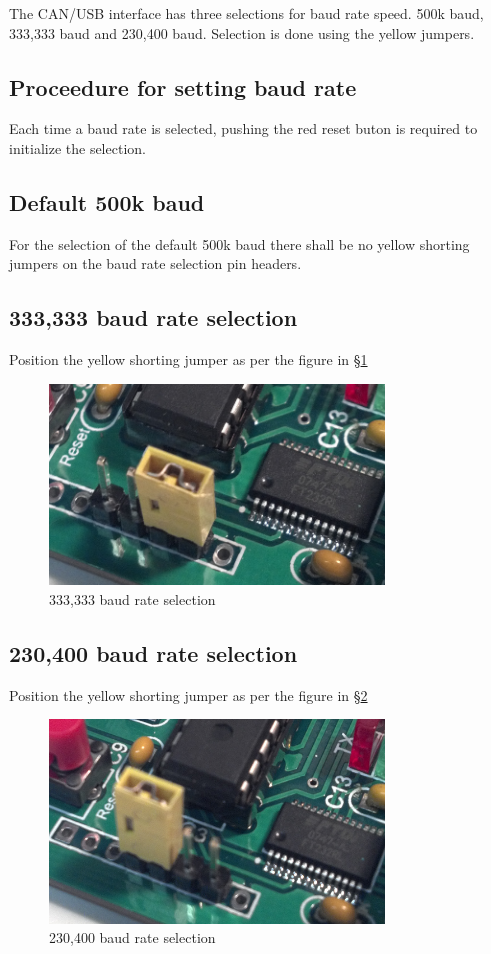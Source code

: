 \documentclass[11pt]{book}
\begin{document}
The CAN/USB interface has three selections for baud rate speed.  500k baud, 333,333 baud and 230,400 baud.  Selection is done using the yellow jumpers.
\subsection{Proceedure for setting baud rate}

Each time a baud rate is selected, pushing the red reset buton is required to initialize the selection.

\subsection{Default 500k baud}
For the selection of the default 500k baud there shall be no yellow shorting jumpers on the baud rate selection pin headers.

\subsection{333,333 baud rate selection}
Position the yellow shorting jumper as per the figure in \S\ref{333333}
\begin{figure}[htbp]
\begin{center}
\includegraphics[width=3.5in]{images/333333_baud.png}
\caption{333,333 baud rate selection}
\label{333333}
\end{center}
\end{figure}


\subsection{230,400 baud rate selection}
Position the yellow shorting jumper as per the figure in \S\ref{230400}
\begin{figure}[htbp]
\begin{center}
\includegraphics[width=3.5in]{images/230400_baud.png}
\caption{230,400 baud rate selection}
\label{230400}
\end{center}
\end{figure}
\end{document}
